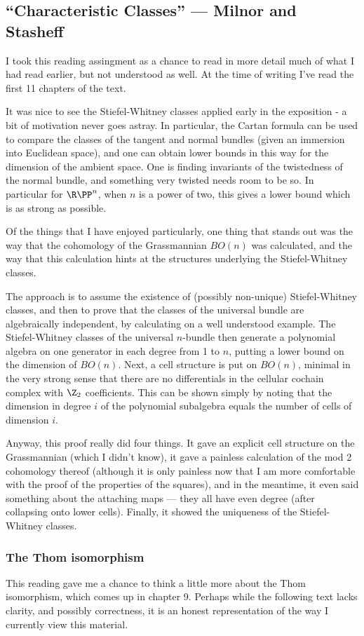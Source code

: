 \documentclass[11pt]{article}
\newcommand{\KanSemResponse}[1]
{
\thispagestyle{fancy}
\subsection*{#1}
}
\begin{document}
\begin{CharacteristicClasses}
\KanSemResponse
{``Characteristic Classes'' --- Milnor and Stasheff}
I took this reading assingment as a chance to read in more detail much of what I had read earlier, but not understood as well. At the time of writing I've read the first 11 chapters of the text.

It was nice to see the Stiefel-Whitney classes applied early in the exposition - a bit of motivation never goes astray. In particular, the Cartan formula can be used to compare the classes of the tangent and normal bundles (given an immersion into Euclidean space), and one can obtain lower bounds in this way for the dimension of the ambient space. One is finding invariants of the twistedness of the normal bundle, and something very twisted needs room to be so. In particular for $\RP^n$, when $n$ is a power of two, this gives a lower bound which is as strong as possible.

Of the things that I have enjoyed particularly, one thing that stands out was the way that the cohomology of the Grassmannian $BO(n)$ was calculated, and the way that this calculation hints at the structures underlying the Stiefel-Whitney classes.

The approach is to assume the existence of (possibly non-unique) Stiefel-Whitney classes, and then to prove that the classes of the universal bundle are algebraically independent, by calculating on a well understood example. The Stiefel-Whitney classes of the universal $n$-bundle then generate a polynomial algebra on one generator in each degree from 1 to $n$, putting a lower bound on the dimension of $BO(n)$. Next, a cell structure is put on $BO(n)$, minimal in the very strong sense that there are no differentials in the cellular cochain complex with $\Z_2$ coefficients. This can be shown simply by noting that the dimension in degree $i$ of the polynomial subalgebra equals the number of cells of dimension $i$.

Anyway, this proof really did four things. It gave an explicit cell structure on the Grassmannian (which I didn't know), it gave a painless calculation of the mod 2 cohomology thereof (although it is only painless now that I am more comfortable with the proof of the properties of the squares), and in the meantime, it even said something about the attaching maps --- they all have even degree (after collapsing onto lower cells). Finally, it showed the uniqueness of the Stiefel-Whitney classes.

\subsubsection*{The Thom isomorphism}
This reading gave me a chance to think a little more about the Thom isomorphism, which comes up in chapter 9. Perhaps while the following text lacks clarity, and possibly correctness, it is an honest representation of the way I currently view this material.


\end{CharacteristicClasses}
\end{document}
